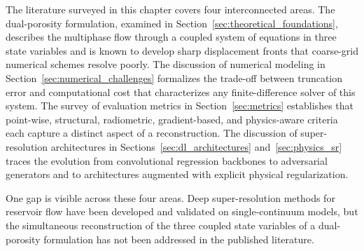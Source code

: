 The literature surveyed in this chapter covers four interconnected areas. The dual-porosity formulation, examined in Section~\ref{sec:theoretical_foundations}, describes the multiphase flow through a coupled system of equations in three state variables and is known to develop sharp displacement fronts that coarse-grid numerical schemes resolve poorly. The discussion of numerical modeling in Section~\ref{sec:numerical_challenges} formalizes the trade-off between truncation error and computational cost that characterizes any finite-difference solver of this system. The survey of evaluation metrics in Section~\ref{sec:metrics} establishes that point-wise, structural, radiometric, gradient-based, and physics-aware criteria each capture a distinct aspect of a reconstruction. The discussion of super-resolution architectures in Sections~\ref{sec:dl_architectures} and~\ref{sec:physics_sr} traces the evolution from convolutional regression backbones to adversarial generators and to architectures augmented with explicit physical regularization.

One gap is visible across these four areas. Deep super-resolution methods for reservoir flow have been developed and validated on single-continuum models, but the simultaneous reconstruction of the three coupled state variables of a dual-porosity formulation has not been addressed in the published literature.
